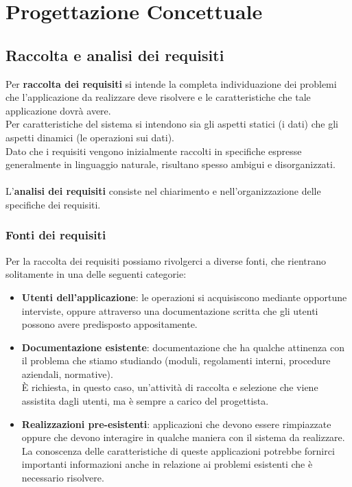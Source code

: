 \chapter{Progettazione Concettuale}



\section{Raccolta e analisi dei requisiti}
Per \textbf{raccolta dei requisiti} si intende la completa individuazione dei problemi che l'applicazione da realizzare deve risolvere e le caratteristiche che tale applicazione dovrà avere.\\ 
Per caratteristiche del sistema si intendono sia gli aspetti statici (i dati) che gli aspetti dinamici (le operazioni sui dati).\\
Dato che i requisiti vengono inizialmente raccolti in specifiche espresse generalmente in linguaggio naturale, risultano spesso ambigui e disorganizzati.\\\\
L'\textbf{analisi dei requisiti} consiste nel chiarimento e nell'organizzazione delle specifiche dei requisiti.

\subsection{Fonti dei requisiti}
Per la raccolta dei requisiti possiamo rivolgerci a diverse fonti, che rientrano solitamente in una delle seguenti categorie:
    \begin{itemize}
        \item{\textbf{Utenti dell'applicazione}: le operazioni si acquisiscono mediante opportune interviste, oppure attraverso una documentazione scritta che gli utenti possono avere predisposto appositamente.}
        \item{\textbf{Documentazione esistente}: documentazione che ha qualche attinenza con il problema che stiamo studiando (moduli, regolamenti interni, procedure aziendali, normative). \\
        È richiesta, in questo caso, un'attività di raccolta e selezione che viene assistita dagli utenti, ma è sempre a carico del progettista.}
        \item{\textbf{Realizzazioni pre-esistenti}: applicazioni che devono essere rimpiazzate oppure che devono interagire in qualche maniera con il sistema da realizzare.\\
        La conoscenza delle caratteristiche di queste applicazioni potrebbe fornirci importanti informazioni anche in relazione ai problemi esistenti che è necessario risolvere.}
    \end{itemize}

